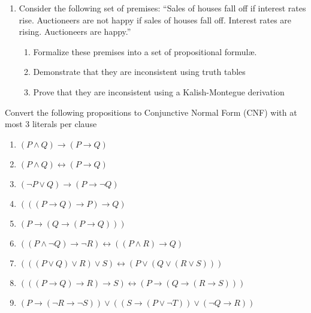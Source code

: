 \documentclass[12pt]{article}
\newenvironment{solution}[2][Solution]{ \begin{trivlist}
\item[\hskip \labelsep {\bfseries #1}]}{\end{trivlist}}
\newenvironment{problem}[2][Problem]{\begin{trivlist}
\item[\hskip \labelsep {\bfseries #1}\hskip \labelsep {\bfseries #2.}]}{\end{trivlist}}
\begin{document}
\begin{problem}{5}
\begin{enumerate}
\item Consider the following set of premises: ``Sales of houses fall off if interest rates rise. Auctioneers are not happy if sales of houses fall off. Interest rates are rising. Auctioneers are happy.''
  \begin{enumerate}
  \item Formalize these premises into a set of propositional formul{\ae}.
  \item Demonstrate that they are inconsistent using truth tables
  \item Prove that they are inconsistent using a Kalish-Montegue derivation
  \end{enumerate}
\end{enumerate}
\end{problem}
\begin{solution}{5}
\item[]

\end{solution}


\vskip 0.5in

\begin{problem}{6}Convert the following propositions to Conjunctive Normal Form (CNF) with at most 3 literals per clause
\begin{enumerate}
  \parskip=0in
  \parsep=0in
  \itemsep=0in
\item $(P \wedge Q) \rightarrow (P \rightarrow Q)$
\item $(P \wedge Q) \leftrightarrow (P \rightarrow Q)$
\item $(\lnot P \vee Q) \rightarrow (P \rightarrow \lnot Q)$
\item $(((P \rightarrow Q) \rightarrow P) \rightarrow Q)$
\item $(P \rightarrow (Q \rightarrow (P \rightarrow Q)))$
\item $((P \wedge \lnot Q) \rightarrow \lnot R) \leftrightarrow ((P \wedge R) \rightarrow Q)$
\item $(((P \vee Q) \vee R) \vee S) \leftrightarrow (P \vee (Q \vee (R \vee S)))$
\item $(((P \rightarrow Q) \rightarrow R) \rightarrow S) \leftrightarrow (P \rightarrow (Q \rightarrow (R \rightarrow S)))$
\item $(P \rightarrow (\lnot R \rightarrow \lnot S)) \vee ((S \rightarrow (P \vee \lnot T)) \vee (\lnot Q \rightarrow R))$
\end{enumerate}
\end{problem}
\begin{solution}{6}
\end{solution}
\end{document}
